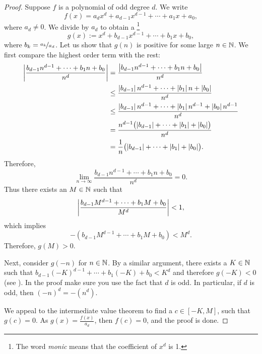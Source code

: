 \begin{proof}
Suppose $f$ is a polynomial of odd degree $d$.  We write
\begin{equation*}
f(x) = a_d x^d + a_{d-1} x^{d-1} + \cdots + a_1 x + a_0 ,
\end{equation*}
where $a_d \not= 0$.  We divide by $a_d$ to obtain a 
\emph{}\footnote{The word \emph{monic} means that
the coefficient of $x^d$ is 1.}
\begin{equation*}
g(x) := x^d + b_{d-1} x^{d-1} + \cdots + b_1 x + b_0 ,
\end{equation*}
where $b_k = \nicefrac{a_k}{a_d}$.
Let us show that $g(n)$ is
positive for some large $n \in {\mathbb{N}}$.
We first compare the highest order term with the rest:
\begin{equation*}
\begin{split}
\left\lvert {\frac{b_{d-1} n^{d-1} + \cdots + b_1 n + b_0}{n^d}} \right\rvert
& =
\frac{\left\lvert {b_{d-1} n^{d-1} + \cdots + b_1 n + b_0} \right\rvert}{n^d}
\\
& \leq
\frac{\left\lvert {b_{d-1}} \right\rvert n^{d-1} + \cdots + \left\lvert {b_1} \right\rvert n + \left\lvert {b_0} \right\rvert}{n^d}
\\
& \leq
\frac{\left\lvert {b_{d-1}} \right\rvert n^{d-1} + \cdots + \left\lvert {b_1} \right\rvert n^{d-1} + \left\lvert {b_0} \right\rvert n^{d-1}}{n^d}
\\
& =
\frac{n^{d-1}\bigl(\left\lvert {b_{d-1}} \right\rvert + \cdots + \left\lvert {b_1} \right\rvert + \left\lvert {b_0} \right\rvert\bigr)}{n^d}
\\
& =
\frac{1}{n}
\bigl(\left\lvert {b_{d-1}} \right\rvert + \cdots + \left\lvert {b_1} \right\rvert + \left\lvert {b_0} \right\rvert\bigr) .
\end{split}
\end{equation*}
Therefore,
\begin{equation*}
\lim_{n\to\infty} \frac{b_{d-1} n^{d-1} + \cdots + b_1 n + b_0}{n^d}
= 0 .
\end{equation*}
Thus there exists an $M \in {\mathbb{N}}$ such that 
\begin{equation*}
\left\lvert {\frac{b_{d-1} M^{d-1} + \cdots + b_1 M + b_0}{M^d}} \right\rvert < 1 ,
\end{equation*}
which implies
\begin{equation*}
-(b_{d-1} M^{d-1} + \cdots + b_1 M + b_0) < M^d .
\end{equation*}
Therefore, $g(M) > 0$.

Next, consider $g(-n)$ for $n \in {\mathbb{N}}$.  By a similar argument,
there exists a $K \in {\mathbb{N}}$ such that
$b_{d-1} {(-K)}^{d-1} + \cdots + b_1 (-K) + b_0 < K^d$
and therefore $g(-K) < 0$ (see ).
In the
proof make sure you use the fact that $d$ is odd.  In particular, 
if $d$ is odd, then ${(-n)}^d = -(n^d)$.

We appeal to the intermediate value theorem to find a
$c \in [-K,M]$, such that $g(c) = 0$.  As $g(x) = \frac{f(x)}{a_d}$,
then $f(c) = 0$, and the proof is done.
\end{proof}

